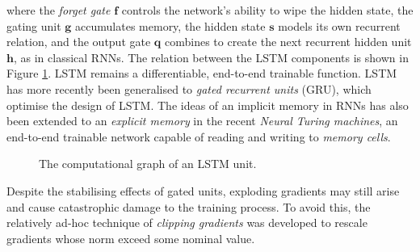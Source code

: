 \documentclass[11pt]{amsart}
\begin{document}
where the \emph{forget gate} $\mathbf{f}$ controls the network's ability to wipe the hidden state, the gating unit $\mathbf{g}$ accumulates memory, the hidden state $\mathbf{s}$ models its own recurrent relation, and the output gate $\mathbf{q}$ combines to create the next recurrent hidden unit $\mathbf{h}$, as in classical RNNs. The relation between the LSTM components is shown in Figure \ref{fig:rnn_lstm}. LSTM remains a differentiable, end-to-end trainable function. LSTM has more recently been generalised to \emph{gated recurrent units} (GRU), which optimise the design of LSTM. The ideas of an implicit memory in RNNs has also been extended to an \emph{explicit memory} in the recent \emph{Neural Turing machines}, an end-to-end trainable network capable of reading and writing to \emph{memory cells}.

\begin{figure}
\centering
{}
\caption{The computational graph of an LSTM unit.}
\label{fig:rnn_lstm}
\end{figure}

Despite the stabilising effects of gated units, exploding gradients may still arise and cause catastrophic damage to the training process. To avoid this, the relatively ad-hoc technique of \emph{clipping gradients} was developed to rescale gradients whose norm exceed some nominal value.
\end{document}
